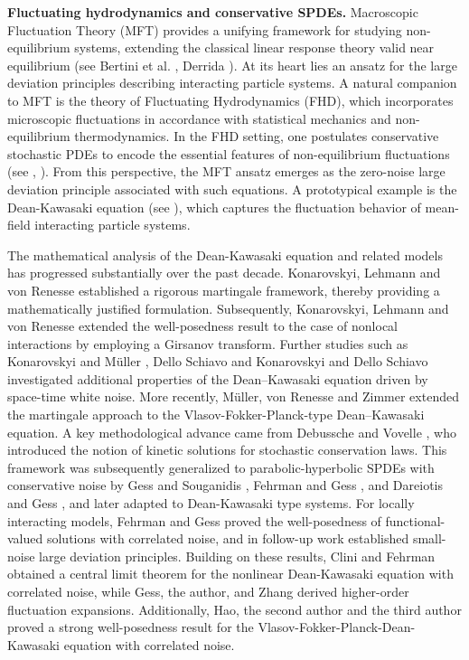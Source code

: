 \documentclass[UTF-8,reqno]{amsart}
\numberwithin{equation}{section}
\begin{document}
{\bf Fluctuating hydrodynamics and conservative SPDEs. }
Macroscopic Fluctuation Theory (MFT) provides a unifying framework for studying non-equilibrium systems, extending the classical linear response theory valid near equilibrium (see Bertini et al. \cite{BDGJL}, Derrida \cite{Derrida}). At its heart lies an ansatz for the large deviation principles describing interacting particle systems. A natural companion to MFT is the theory of Fluctuating Hydrodynamics (FHD), which incorporates microscopic fluctuations in accordance with statistical mechanics and non-equilibrium thermodynamics. In the FHD setting, one postulates conservative stochastic PDEs to encode the essential features of non-equilibrium fluctuations (see \cite{LL87}, \cite{HS}). From this perspective, the MFT ansatz emerges as the zero-noise large deviation principle associated with such equations. A prototypical example is the Dean-Kawasaki equation (see \cite{D96,K98}), which captures the fluctuation behavior of mean-field interacting particle systems.

The mathematical analysis of the Dean-Kawasaki equation and related models has progressed substantially over the past decade. Konarovskyi, Lehmann and von Renesse \cite{KLR19}  established a rigorous martingale framework, thereby providing a mathematically justified formulation. Subsequently, Konarovskyi, Lehmann and von Renesse \cite{KLR20} extended the well-posedness result to the case of nonlocal interactions by employing a Girsanov transform.
Further studies such as Konarovskyi and M\"uller \cite{KF24}, Dello Schiavo and Konarovskyi \cite{DK25} and Dello Schiavo \cite{D25} investigated additional properties of the Dean--Kawasaki equation driven by space-time white noise. More recently, M\"uller, von Renesse and Zimmer \cite{FMJ25} extended the martingale approach to the Vlasov-Fokker-Planck-type Dean--Kawasaki equation. A key methodological advance came from Debussche and Vovelle \cite{DV10}, who introduced the notion of kinetic solutions for stochastic conservation laws. This framework was subsequently generalized to parabolic-hyperbolic SPDEs with conservative noise by Gess and Souganidis \cite{GS17}, Fehrman and Gess \cite{FG19}, and Dareiotis and Gess \cite{DG20}, and later adapted to Dean-Kawasaki type systems. For locally interacting models, Fehrman and Gess \cite{FG24} proved the well-posedness of functional-valued solutions with correlated noise, and in follow-up work \cite{FG23} established small-noise large deviation principles. Building on these results, Clini and Fehrman \cite{CF23} obtained a central limit theorem for the nonlinear Dean-Kawasaki equation with correlated noise, while Gess, the author, and Zhang \cite{GWZ24} derived higher-order fluctuation expansions. Additionally, Hao, the second author and the third author \cite{HWJ25} proved a strong well-posedness result for the Vlasov-Fokker-Planck-Dean-Kawasaki equation with correlated noise. 
\end{document}

